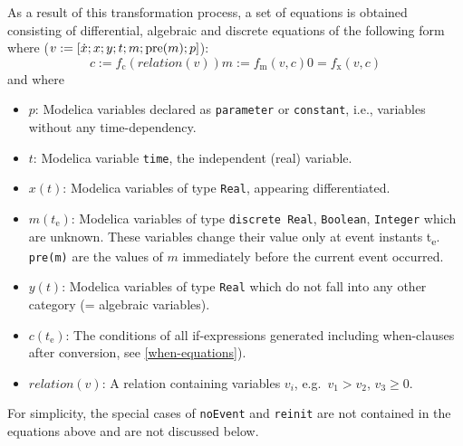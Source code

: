 As a result of this transformation process, a set of equations is
obtained consisting of differential, algebraic and discrete equations of
the following form where ($v := \lbrack \dot{x}; x; y; t; m; \text{\lstinline!pre!}(m); p\rbrack$):
\begin{subequations}
\begin{equation}\label{eq:crossing}
c := f_{\mathrm{c}}(\mathit{relation}(v))
\end{equation}
\begin{equation}
m := f_{\mathrm{m}}(v, c)
\end{equation}
\begin{equation}\label{eq:dae}
0 = f_{\mathrm{x}}(v, c)
\end{equation}
\label{eq:hydrid-dae}
\end{subequations}
and where
\begin{itemize}
\item $p$:
Modelica variables declared as \lstinline!parameter! or \lstinline!constant!, i.e., variables without any time-dependency.

\item $t$:
Modelica variable \lstinline!time!, the independent (real) variable.

\item $x(t)$:
Modelica variables of type \lstinline!Real!, appearing differentiated.

\item $m(t_{\mathrm{e}})$:
Modelica variables of type \lstinline!discrete Real!, \lstinline!Boolean!, \lstinline!Integer! which are unknown.  These variables change their value only at event instants t\textsubscript{e}. \lstinline!pre(m)! are the values of $m$ immediately before the current event occurred.

\item $y(t)$:
Modelica variables of type \lstinline!Real! which do not fall into any other category (= algebraic variables).

\item $c(t_{\mathrm{e}})$:
The conditions of all if-expressions generated including when-clauses after conversion, see \cref{when-equations}).

\item $\mathit{relation}(v)$:
A relation containing variables $v_{i}$, e.g.\ $v_{1} > v_{2}$, $v_{3} \geq 0$.
\end{itemize}

For simplicity, the special cases of \lstinline!noEvent! and \lstinline!reinit! are not contained in the equations
above and are not discussed below.

